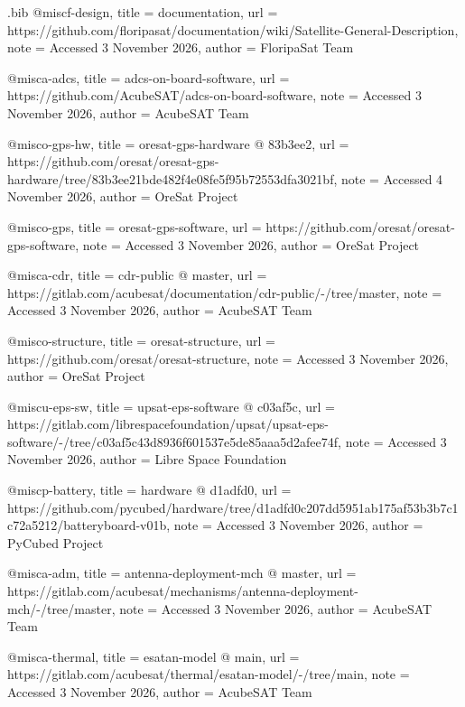 \begin{filecontents*}[overwrite]{\jobname.bib}
@misc{f-design,
  title = {{documentation}},
  url = {https://github.com/floripasat/documentation/wiki/Satellite-General-Description},
  note = {Accessed 3 November 2026},
  author = {{FloripaSat Team}}
}

@misc{a-adcs,
  title = {{adcs-\allowbreak{}on-\allowbreak{}board-\allowbreak{}software}},
  url = {https://github.com/AcubeSAT/adcs-on-board-software},
  note = {Accessed 3 November 2026},
  author = {{AcubeSAT Team}}
}

@misc{o-gps-hw,
  title = {{oresat-\allowbreak{}gps-\allowbreak{}hardware @ 83b3ee2}},
  url = {https://github.com/oresat/oresat-gps-hardware/tree/83b3ee21bde482f4e08fe5f95b72553dfa3021bf},
  note = {Accessed 4 November 2026},
  author = {{OreSat Project}}
}

@misc{o-gps,
  title = {{oresat-\allowbreak{}gps-\allowbreak{}software}},
  url = {https://github.com/oresat/oresat-gps-software},
  note = {Accessed 3 November 2026},
  author = {{OreSat Project}}
}

@misc{a-cdr,
  title = {{cdr-\allowbreak{}public @ master}},
  url = {https://gitlab.com/acubesat/documentation/cdr-public/-/tree/master},
  note = {Accessed 3 November 2026},
  author = {{AcubeSAT Team}}
}

@misc{o-structure,
  title = {{oresat-\allowbreak{}structure}},
  url = {https://github.com/oresat/oresat-structure},
  note = {Accessed 3 November 2026},
  author = {{OreSat Project}}
}

@misc{u-eps-sw,
  title = {{upsat-\allowbreak{}eps-\allowbreak{}software @ c03af5c}},
  url = {https://gitlab.com/librespacefoundation/upsat/upsat-eps-software/-/tree/c03af5c43d8936f601537e5de85aaa5d2afee74f},
  note = {Accessed 3 November 2026},
  author = {{Libre Space Foundation}}
}

@misc{p-battery,
  title = {{hardware @ d1adfd0}},
  url = {https://github.com/pycubed/hardware/tree/d1adfd0c207dd5951ab175af53b3b7c1c72a5212/batteryboard-v01b},
  note = {Accessed 3 November 2026},
  author = {{PyCubed Project}}
}

@misc{a-adm,
  title = {{antenna-\allowbreak{}deployment-\allowbreak{}mch @ master}},
  url = {https://gitlab.com/acubesat/mechanisms/antenna-deployment-mch/-/tree/master},
  note = {Accessed 3 November 2026},
  author = {{AcubeSAT Team}}
}

@misc{a-thermal,
  title = {{esatan-\allowbreak{}model @ main}},
  url = {https://gitlab.com/acubesat/thermal/esatan-model/-/tree/main},
  note = {Accessed 3 November 2026},
  author = {{AcubeSAT Team}}
}


\end{filecontents*}

